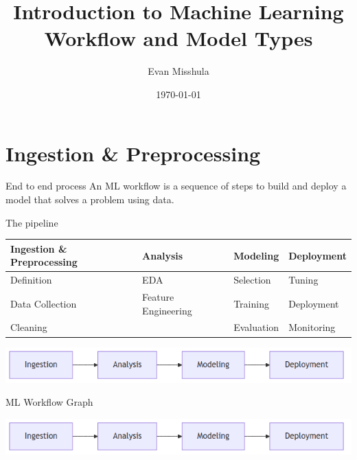 \documentclass[aspectratio=169]{beamer}
\author{Evan Misshula}
\date{\today}
\title{Introduction to Machine Learning Workflow and Model Types}
\begin{document}
\maketitle

\section{Ingestion \& Preprocessing}
\label{sec:org2228b29}
\begin{frame}[label={sec:org2d9ebec}]{End to end process}
An \alert{ML workflow} is a sequence of steps to build and deploy a model that
solves a problem using data.
\end{frame}

\begin{frame}[label={sec:org7ad0784}]{The pipeline}
\begin{center}
\begin{tabular}{llll}
Ingestion \& Preprocessing & Analysis & Modeling & Deployment\\[0pt]
\hline
Definition & EDA & Selection & Tuning\\[0pt]
Data Collection & Feature Engineering & Training & Deployment\\[0pt]
Cleaning &  & Evaluation & Monitoring\\[0pt]
\end{tabular}
\end{center}

\begin{center}
\includegraphics[width=.9\linewidth]{workflow.png}
\end{center}
\end{frame}

\begin{frame}[label={sec:org17d77d1}]{ML Workflow Graph}
\begin{center}
\begin{center}
\includegraphics[width=.9\linewidth]{workflow.png}
\end{center}
\end{center}
\end{frame}
\end{document}
